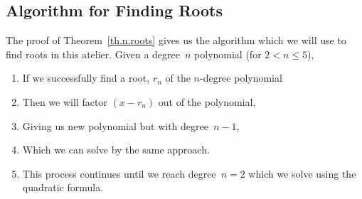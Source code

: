 \subsection{Algorithm for Finding Roots}
\label{sec.algorithm}

The proof of Theorem~\ref{th.n.roots} gives us the algorithm which we will use to find
roots in this atelier.  Given a degree~$n$ polynomial (for $2<n\leq5$),
\begin{enumerate}
\item If we successfully find a root, $r_n$ of the $n$-degree polynomial
\item Then we will factor  $(x-r_n)$ out of the polynomial,
\item Giving us new polynomial but with degree~$n-1$,
\item Which we can solve by the same approach.  
\item This process continues until we reach degree~$n=2$ which we
  solve using the quadratic formula.

\end{enumerate}


